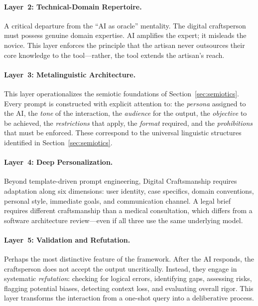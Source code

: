 \documentclass[11pt,a4paper]{article}
\begin{document}
\paragraph{Layer~2: Technical-Domain Repertoire.} A critical departure from the ``AI as oracle'' mentality. The digital craftsperson must possess genuine domain expertise. AI amplifies the expert; it misleads the novice. This layer enforces the principle that the artisan never outsources their core knowledge to the tool---rather, the tool extends the artisan's reach.

\paragraph{Layer~3: Metalinguistic Architecture.} This layer operationalizes the semiotic foundations of Section~\ref{sec:semiotics}. Every prompt is constructed with explicit attention to: the \emph{persona} assigned to the AI, the \emph{tone} of the interaction, the \emph{audience} for the output, the \emph{objective} to be achieved, the \emph{restrictions} that apply, the \emph{format} required, and the \emph{prohibitions} that must be enforced. These correspond to the universal linguistic structures identified in Section~\ref{sec:semiotics}.

\paragraph{Layer~4: Deep Personalization.} Beyond template-driven prompt engineering, Digital Craftsmanship requires adaptation along six dimensions: user identity, case specifics, domain conventions, personal style, immediate goals, and communication channel. A legal brief requires different craftsmanship than a medical consultation, which differs from a software architecture review---even if all three use the same underlying model.

\paragraph{Layer~5: Validation and Refutation.} Perhaps the most distinctive feature of the framework. After the AI responds, the craftsperson does not accept the output uncritically. Instead, they engage in systematic \emph{refutation}: checking for logical errors, identifying gaps, assessing risks, flagging potential biases, detecting context loss, and evaluating overall rigor. This layer transforms the interaction from a one-shot query into a deliberative process.
\end{document}
